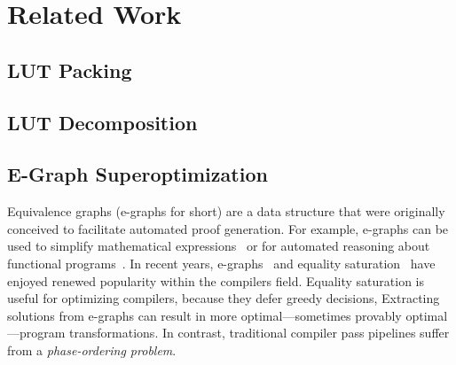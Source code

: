\section{Related Work}\label{sec:relatedwork}

\subsection{LUT Packing}\label{sec:relatedwork:packing}

\subsection{LUT Decomposition}\label{sec:relatedwork:decomp}

\subsection{E-Graph Superoptimization}\label{sec:relatedwork:egraph}
Equivalence graphs (e-graphs for short) are a data structure that were
originally conceived to facilitate automated proof generation. For example,
e-graphs can be used to simplify mathematical expressions~\cite{egraphmath} or
for automated reasoning about functional programs~\cite{cclemma}. In recent
years, e-graphs~\cite{eggpaper} and equality saturation~\cite{eqsat} have
enjoyed renewed popularity within the compilers field. Equality saturation is
useful for optimizing compilers, because they defer greedy decisions,
Extracting solutions from e-graphs can result in more optimal---sometimes
provably optimal---program transformations. In contrast, traditional compiler
pass pipelines suffer from a \textit{phase-ordering problem}.
